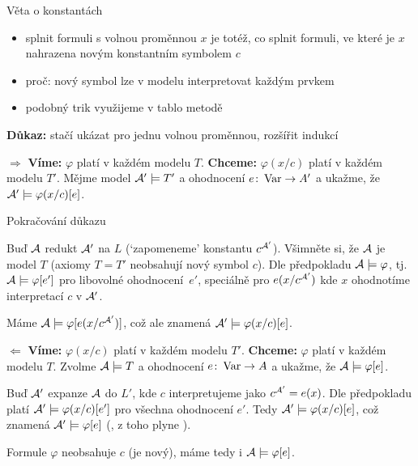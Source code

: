 \documentclass{beamer}
\begin{document}
\begin{frame}{Věta o konstantách}

    \pause
    \begin{itemize}
        \item splnit formuli s volnou proměnnou $x$ je totéž, co splnit formuli, ve které je $x$ nahrazena \alert{novým} konstantním symbolem $c$\pause
        \item proč: nový symbol lze v modelu interpretovat každým prvkem\pause
        \item podobný trik využijeme v tablo metodě\pause
    \end{itemize}


    \pause
    \textbf{Důkaz:} stačí ukázat pro jednu volnou proměnnou, rozšířit indukcí

    \pause
    \alert{\Large \bf $\Rightarrow$} \textbf{Víme:} $\varphi$ platí v každém modelu $T$. \textbf{Chceme:} $\varphi(x/c)$ platí v každém modelu $T'$. \pause Mějme model $\mathcal{A}'\models T'$ a ohodnocení $e\colon\operatorname{Var}\to A'$ a ukažme, že \alert{$\mathcal{A}'\models\varphi(x/c)[e]$}.

\end{frame}


\begin{frame}{Pokračování důkazu}

    Buď $\mathcal{A}$ redukt $\mathcal{A}'$ na $L$ (`zapomeneme' konstantu $c^{\mathcal{A}'}$). Všimněte si, že \alert{$\mathcal{A}$ je model $T$} (axiomy $T=T'$ neobsahují \alert{nový} symbol $c$). \pause Dle předpokladu $\mathcal{A}\models\varphi$, tj. $\mathcal{A}\models\varphi[e']$ pro \alert{libovolné} ohodnocení~$e'$, speciálně pro $e(x/c^{\mathcal{A}'})$ kde $x$ ohodnotíme  interpretací $c$ v $\mathcal{A}'$.
    
    \pause 
    Máme $\mathcal{A}\models\varphi[e(x/c^{\mathcal{A}'})]$, což ale znamená $\mathcal{A}'\models\varphi(x/c)[e]$.
    
    \pause 
    \alert{\Large \bf $\Leftarrow$} \textbf{Víme:} $\varphi(x/c)$ platí v každém modelu $T'$. \textbf{Chceme:} $\varphi$ platí v každém modelu $T$. \pause Zvolme $\mathcal{A}\models T$ a ohodnocení $e\colon\operatorname{Var}\to A$ a ukažme, že \alert{$\mathcal{A}\models\varphi[e]$}.

    \pause 
    Buď $\mathcal{A}'$ expanze $\mathcal{A}$ do $L'$, kde $c$ interpretujeme jako $c^{\mathcal{A}'}=e(x)$. \pause Dle předpokladu platí $\mathcal{A}'\models\varphi(x/c)[e']$ pro všechna ohodnocení $e'$. \pause Tedy $\mathcal{A}'\models\varphi(x/c)[e]$, což znamená \alert{$\mathcal{A}'\models\varphi[e]$} (, z toho plyne ).
    
    \pause 
    Formule $\varphi$ neobsahuje $c$ (je \alert{nový}), máme tedy i $\mathcal{A}\models\varphi[e]$. \hfill\qedsymbol
    
\end{frame}
\end{document}
